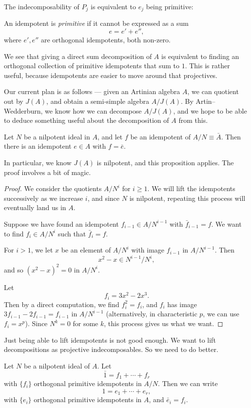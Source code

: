 \documentclass[a4paper]{article}
\begin{document}
The indecomposability of $P_j$ is equivalent to $e_j$ being primitive:
\begin{defi}
  An idempotent is \emph{primitive} if it cannot be expressed as a sum
  \[
    e = e' + e'',
  \]
  where $e', e''$ are orthogonal idempotents, both non-zero.
\end{defi}
We see that giving a direct sum decomposition of $A$ is equivalent to finding an orthogonal collection of primitive idempotents that sum to $1$. This is rather useful, because idempotents are easier to move around that projectives.

Our current plan is as follows --- given an Artinian algebra $A$, we can quotient out by $J(A)$, and obtain a semi-simple algebra $A/J(A)$. By Artin--Wedderburn, we know how we can decompose $A/J(A)$, and we hope to be able to deduce something useful about the decomposition of $A$ from this.
\begin{prop}
  Let $N$ be a nilpotent ideal in $A$, and let $f$ be an idempotent of $A/N \equiv \bar{A}$. Then there is an idempotent $e \in A$ with $f = \bar{e}$.
\end{prop}
In particular, we know $J(A)$ is nilpotent, and this proposition applies. The proof involves a bit of magic.
\begin{proof}
  We consider the quotients $A/N^i$ for $i \geq 1$. We will lift the idempotents successively as we increase $i$, and since $N$ is nilpotent, repeating this process will eventually land us in $A$.

  Suppose we have found an idempotent $f_{i - 1} \in A/N^{i - 1}$ with $\bar{f}_{i - 1} = f$. We want to find $f_i \in A/N^i$ such that $\bar{f}_i = f$.

  For $i > 1$, we let $x$ be an element of $A/N^i$ with image $f_{i - 1}$ in $A/N^{i - 1}$. Then
  \[
    x^2 - x \in N^{i - 1}/N^i,
  \]
  and so $(x^2 - x)^2 = 0$ in $A/N^i$.

  Let
  \[
    f_i = 3x^2 - 2x^3.
  \]
  Then by a direct computation, we find $f_i^2 = f_i$, and $f_i$ has image $3f_{i - 1} - 2 f_{i - 1} = f_{i - 1}$ in $A/N^{i - 1}$ (alternatively, in characteristic $p$, we can use $f_i = x^p$). Since $N^k = 0$ for some $k$, this process gives us what we want.
\end{proof}

Just being able to lift idempotents is not good enough. We want to lift decompositions as projective indecomposables. So we need to do better.
\begin{cor}
  Let $N$ be a nilpotent ideal of $A$. Let
  \[
    \bar{1} = f_1 + \cdots + f_r
  \]
  with $\{f_i\}$ orthogonal primitive idempotents in $A/N$. Then we can write
  \[
    1 = e_1 + \cdots + e_r,
  \]
  with $\{e_i\}$ orthogonal primitive idempotents in $A$, and $\bar{e}_i = f_i$.
\end{cor}
\end{document}
